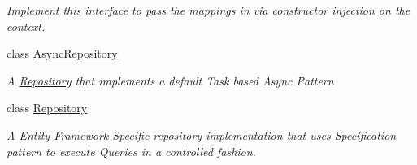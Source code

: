 \begin{DoxyCompactItemize}
\begin{DoxyCompactList}\small\item\em Implement this interface to pass the mappings in via constructor injection on the context. \end{DoxyCompactList}\item 
class \hyperlink{class_highway_1_1_data_1_1_async_repository}{Async\-Repository}
\begin{DoxyCompactList}\small\item\em A \hyperlink{class_highway_1_1_data_1_1_repository}{Repository} that implements a default Task based Async Pattern \end{DoxyCompactList}\item 
class \hyperlink{class_highway_1_1_data_1_1_repository}{Repository}
\begin{DoxyCompactList}\small\item\em A Entity Framework Specific repository implementation that uses Specification pattern to execute Queries in a controlled fashion. \end{DoxyCompactList}\end{DoxyCompactItemize}
